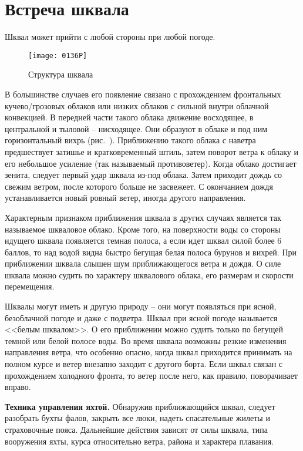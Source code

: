 \section{Встреча шквала}

Шквал может прийти с любой стороны при любой погоде.

\begin{figure*}[htb]
  \centering{}
  \texttt{[image: 0136P]}
  \caption{Структура шквала}
  \label{fig:136}
\end{figure*}

В большинстве случаев его появление связано с прохождением фронтальных кучево\-/грозовых облаков или низких облаков с сильной внутри облачной конвекцией. В передней части такого облака движение восходящее, в центральной и тыловой \--- нисходящее. Они образуют в облаке и под ним горизонтальный вихрь (рис.~). Приближению такого облака с наветра предшествует затишье и кратковременный штиль, затем поворот ветра к облаку и его небольшое усиление (так называемый противоветер). Когда облако достигает зенита, следует первый удар шквала из-под облака. Затем приходит дождь со свежим ветром, после которого больше не засвежеет. С окончанием дождя устанавливается новый ровный ветер, иногда другого направления.

Характерным признаком приближения шквала в других случаях является так называемое шкваловое облако. Кроме того, на поверхности воды со стороны идущего шквала появляется темная полоса, а если идет шквал силой более 6 баллов, то над водой видна быстро бегущая белая полоса бурунов и вихрей. При приближении шквала слышен шум приближающегося ветра и дождя. О силе шквала можно судить по характеру шквалового облака, его размерам и скорости перемещения.

Шквалы могут иметь и другую природу \--- они могут появляться при ясной, безоблачной погоде и даже с подветра. Шквал при ясной погоде называется <<белым шквалом>>. О его приближении можно судить только по бегущей темной или белой полосе воды. Во время шквала возможны резкие изменения направления ветра, что особенно опасно, когда шквал приходится принимать на полном курсе и ветер внезапно заходит с другого борта. Если шквал связан с прохождением холодного фронта, то ветер после него, как правило, поворачивает вправо. 

\textbf{Техника управления яхтой.} Обнаружив приближающийся шквал, следует разобрать бухты фалов, закрыть все люки, надеть спасательные жилеты и страховочные пояса. Дальнейшие действия зависят от силы шквала, типа вооружения яхты, курса относительно ветра, района и характера плавания.

